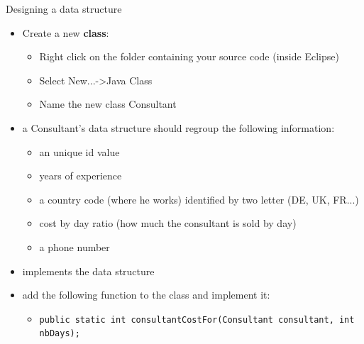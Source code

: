 {  \begin{frame}
    \begin{block}{Designing a data structure}
      \begin{itemize}
        \item Create a new \textbf{class}:
        \begin{itemize}
          \item Right click on the folder containing your source code (inside Eclipse)
          \item Select New...->Java Class
          \item Name the new class Consultant
        \end{itemize}
        \item a Consultant's data structure should regroup the following information:
        \begin{itemize}
          \item an unique id value
          \item years of experience
          \item a country code (where he works) identified by two letter (DE, UK, FR...)
          \item cost by day ratio (how much the consultant is sold by day)
          \item a phone number
        \end{itemize}
        \item implements the data structure
        \item add the following function to the class and implement it:
        \begin{itemize}
          \item \texttt{public static int consultantCostFor(Consultant consultant, int nbDays);}
        \end{itemize}
      \end{itemize}
    \end{block}
  \end{frame}
}


